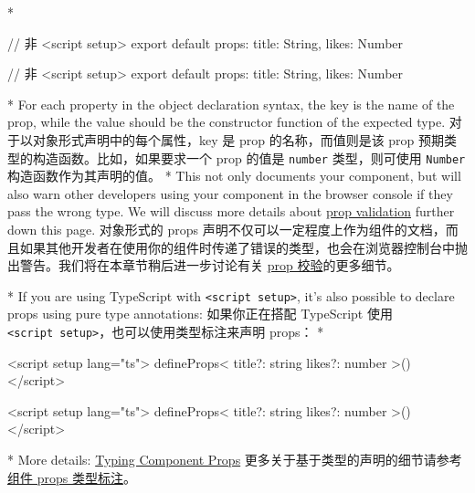 \begin{paracol}{2}
\switchcolumn[0]*%
\begin{codeJs}
// 非 <script setup>
export default {
  props: {
    title: String,
    likes: Number
  }
}
\end{codeJs}
\switchcolumn
\begin{codeJs}
// 非 <script setup>
export default {
  props: {
    title: String,
    likes: Number
  }
}
\end{codeJs}
\switchcolumn[0]*%
For each property in the object declaration syntax, the key is the name
of the prop, while the value should be the constructor function of the
expected type.
\switchcolumn
对于以对象形式声明中的每个属性，key 是 prop 的名称，而值则是该 prop
预期类型的构造函数。比如，如果要求一个 prop 的值是 \texttt{number}
类型，则可使用 \texttt{Number} 构造函数作为其声明的值。
\switchcolumn[0]*%
This not only documents your component, but will also warn other
developers using your component in the browser console if they pass the
wrong type. We will discuss more details about
\href{https://vuejs.org/guide/components/props.html\#prop-validation}{prop
validation} further down this page.
\switchcolumn
对象形式的 props
声明不仅可以一定程度上作为组件的文档，而且如果其他开发者在使用你的组件时传递了错误的类型，也会在浏览器控制台中抛出警告。我们将在本章节稍后进一步讨论有关
\href{https://cn.vuejs.org/guide/components/props.html\#prop-validation}{prop
校验}的更多细节。

\switchcolumn[0]*%
If you are using TypeScript with
\texttt{\textless{}script\ setup\textgreater{}}, it's also possible to
declare props using pure type annotations:
\switchcolumn
如果你正在搭配 TypeScript 使用
\texttt{\textless{}script\ setup\textgreater{}}，也可以使用类型标注来声明
props：
\switchcolumn[0]*%
\begin{codeHtml}
<script setup lang="ts">
defineProps<{
  title?: string
  likes?: number
}>()
</script>
\end{codeHtml}
\switchcolumn
\begin{codeHtml}
<script setup lang="ts">
defineProps<{
  title?: string
  likes?: number
}>()
</script>
\end{codeHtml}
\switchcolumn[0]*%
More details:
\href{https://vuejs.org/guide/typescript/composition-api.html\#typing-component-props}{Typing
Component Props}
\switchcolumn
更多关于基于类型的声明的细节请参考\href{https://cn.vuejs.org/guide/typescript/composition-api.html\#typing-component-props}{组件
props 类型标注}。
\end{paracol}

